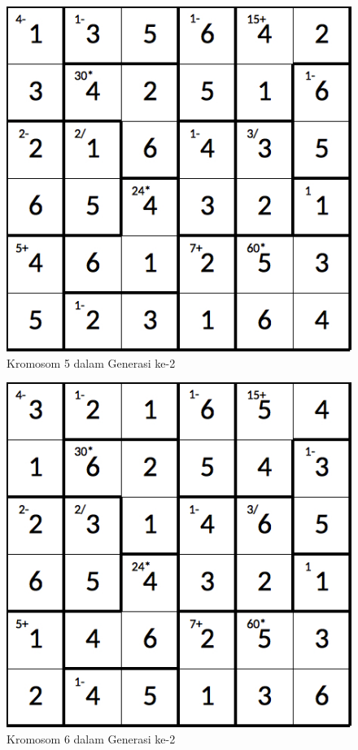 \begin{figure}
\centering
\captionsetup{justification=centering}
\includegraphics[scale=0.333]{Gambar/hybridgenetic/Generation2Chromosome5}
\caption[Kromosom 5 dalam Generasi ke-2]{Kromosom 5 dalam Generasi ke-2}
\label{fig:analisisg2k5}
\end{figure}

\begin{figure}
\centering
\captionsetup{justification=centering}
\includegraphics[scale=0.333]{Gambar/hybridgenetic/Generation2Chromosome6}
\caption[Kromosom 6 dalam Generasi ke-2]{Kromosom 6 dalam Generasi ke-2}
\label{fig:analisisg2k6}
\end{figure}

